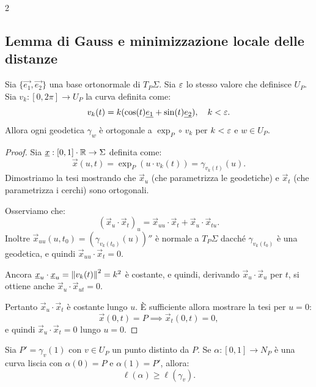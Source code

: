 \begin{multicols*}{2}
    \subsection{Lemma di Gauss e minimizzazione locale delle distanze}

    \begin{lemma} \label{lem:gauss}
        Sia $\{\vec{e_1}, \vec{e_2}\}$ una base ortonormale di $T_P \Sigma$.
        Sia $\varepsilon$ lo stesso valore che definisce $U_P$.
        Sia
        $v_k : [0, 2\pi] \to U_P$ la curva definita come:
        \[
            v_k(t) = k(\cos(t) {\underline{e_1}} + \sin(t) {\underline{e_2}}), \quad k < \varepsilon.
        \]
        Allora ogni geodetica
        $\gamma_w$ è ortogonale a $\exp_P \circ \, v_k$ per $k < \varepsilon$ e $w \in U_P$.
    \end{lemma}

    \begin{proof}
        Sia ${\underline{x}} : [0, 1] \cdot \mathbb{R} \to \Sigma$ definita come:
        \[ \vec{x}(u, t) = \exp_P(u \cdot v_k(t)) = \gamma_{v_k(t)}(u). \]
        Dimostriamo la tesi mostrando che $\vec{x}_u$ (che parametrizza le geodetiche) e $\vec{x}_t$ (che parametrizza
        i cerchi) sono ortogonali. \smallskip

        Osserviamo che:
        \[ (\vec{x}_u \cdot \vec{x}_t)_u = \vec{x}_{uu} \cdot \vec{x}_t + \vec{x}_u \cdot \vec{x}_{tu}. \]
        Inoltre $\vec{x}_{uu}(u, t_0) = (\gamma_{v_k(t_0)}(u))''$ è normale a $T_P \Sigma$ dacché
        $\gamma_{v_k(t_0)}$ è una geodetica, e quindi $\vec{x}_{uu} \cdot \vec{x}_t = 0$. \smallskip

        Ancora ${\underline{x}}_u \cdot {\underline{x}}_u = \left\lVert v_k(t) \right\rVert^2 = k^2$ è costante, e quindi, derivando
        $\vec{x}_u \cdot \vec{x}_u$ per $t$, si ottiene anche $\vec{x}_u \cdot \vec{x}_{ut} = 0$. \smallskip

        Pertanto $\vec{x}_u \cdot \vec{x}_t$ è costante lungo $u$. È sufficiente allora mostrare la tesi per
        $u = 0$:
        \[
            \vec{x}(0, t) = P \implies \vec{x}_t(0, t) = 0,
        \]
        e quindi $\vec{x}_u \cdot \vec{x}_t = 0$ lungo $u = 0$.
    \end{proof}

    \begin{corollary}
        Sia $P' = \gamma_v(1)$ con $v \in U_P$ un punto distinto da $P$. Se $\alpha : [0, 1] \to N_P$
        è una curva liscia con $\alpha(0) = P$ e $\alpha(1) = P'$, allora:
        \[
            \boxed{\ell(\alpha) \geq \ell(\gamma_{v}).}
        \]
    \end{corollary}


\end{multicols*}
